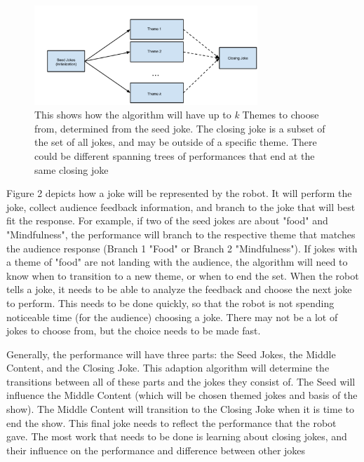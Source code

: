 \documentclass[onecolumn, draftclsnofoot,10pt, compsoc]{IEEEtran}
\begin{document}
\begin{figure}[H]
  \centering
  \includegraphics[width=0.75\textwidth,height=0.75\textheight,keepaspectratio]{fig0}
  \caption{This shows how the algorithm will have up to \textit{k} Themes to choose from, determined from the seed joke. The closing joke is a subset of the set of all jokes, and may be outside of a specific theme. There could be different spanning trees of performances that end at the same closing joke}
\end{figure}

Figure 2 depicts how a joke will be represented by the robot. It will perform the joke, collect audience feedback information, and branch to the joke that will best fit the response. For example, if two of the seed jokes are about "food" and "Mindfulness", the performance will branch to the respective theme that matches the audience response (Branch 1 "Food" or Branch 2 "Mindfulness"). If jokes with a theme of "food" are not landing with the audience, the algorithm will need to know when to transition to a new theme, or when to end the set. When the robot tells a joke, it needs to be able to analyze the feedback and choose the next joke to perform. This needs to be done quickly, so that the robot is not spending noticeable time (for the audience) choosing a joke. There may not be a lot of jokes to choose from, but the choice needs to be made fast.

Generally, the performance will have three parts: the Seed Jokes, the Middle Content, and the Closing Joke. This adaption algorithm will determine the transitions between all of these parts and the jokes they consist of. The Seed will influence the Middle Content (which will be chosen themed jokes and basis of the show). The Middle Content will transition to the Closing Joke when it is time to end the show. This final joke needs to reflect the performance that the robot gave. The most work that needs to be done is learning about closing jokes, and their influence on the performance and difference between other jokes
\end{document}
